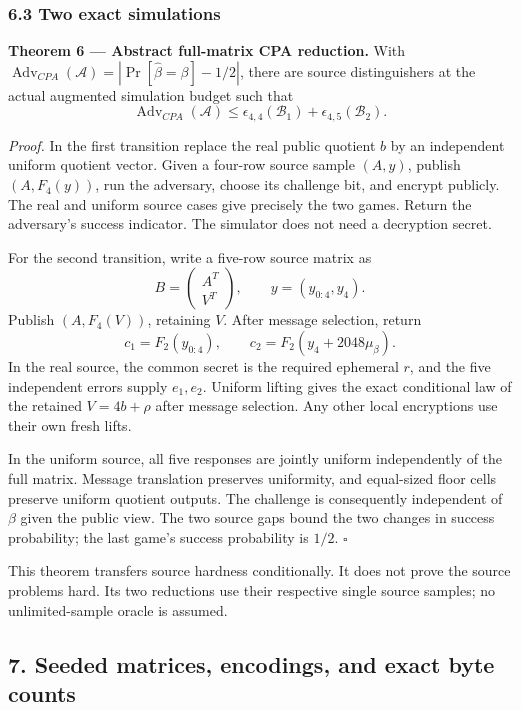 \documentclass[
  10pt,
  a4paper,
]{article}
\begin{document}
\subsubsection{6.3 Two exact simulations}\label{two-exact-simulations}

\textbf{Theorem 6 --- Abstract full-matrix CPA reduction.} With
\(\operatorname{Adv}_{CPA}(\mathcal A)=|\Pr[\widehat\beta=\beta]-1/2|\),
there are source distinguishers at the actual augmented simulation
budget such that \[
\operatorname{Adv}_{CPA}(\mathcal A)\le
\epsilon_{4,4}(\mathcal B_1)+\epsilon_{4,5}(\mathcal B_2).
\]

\emph{Proof.} In the first transition replace the real public quotient
\(b\) by an independent uniform quotient vector. Given a four-row source
sample \((A,y)\), publish \((A,F_4(y))\), run the adversary, choose its
challenge bit, and encrypt publicly. The real and uniform source cases
give precisely the two games. Return the adversary's success indicator.
The simulator does not need a decryption secret.

For the second transition, write a five-row source matrix as \[
B=\begin{pmatrix}A^T\\V^T\end{pmatrix},\qquad y=(y_{0:4},y_4).
\] Publish \((A,F_4(V))\), retaining \(V\). After message selection,
return \[
c_1=F_2(y_{0:4}),\qquad c_2=F_2(y_4+2048\mu_\beta).
\] In the real source, the common secret is the required ephemeral
\(r\), and the five independent errors supply \(e_1,e_2\). Uniform
lifting gives the exact conditional law of the retained \(V=4b+\rho\)
after message selection. Any other local encryptions use their own fresh
lifts.

In the uniform source, all five responses are jointly uniform
independently of the full matrix. Message translation preserves
uniformity, and equal-sized floor cells preserve uniform quotient
outputs. The challenge is consequently independent of \(\beta\) given
the public view. The two source gaps bound the two changes in success
probability; the last game's success probability is \(1/2\). \(\square\)

This theorem transfers source hardness conditionally. It does not prove
the source problems hard. Its two reductions use their respective single
source samples; no unlimited-sample oracle is assumed.

\subsection{7. Seeded matrices, encodings, and exact byte
counts}\label{seeded-matrices-encodings-and-exact-byte-counts}
\end{document}
